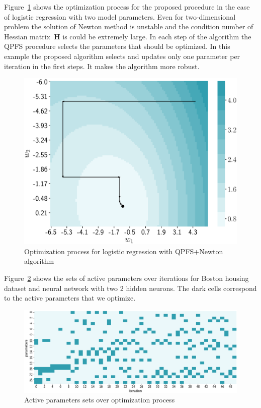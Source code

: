 \documentclass[a4paper,12pt]{article}
\theoremstyle{plain} %
\theoremstyle{definition} %
\theoremstyle{remark} %
\newcommand{\bH}{\mathbf{H}}
\begin{document}
	Figure~\ref{fig:irls_qpfs_2d} shows the optimization process for the proposed procedure in the case of logistic regression with two model parameters. 
	Even for two-dimensional problem the solution of Newton method is unstable and the condition number of Hessian matrix~$\bH$ is could be extremely large. 
	In each step of the algorithm the QPFS procedure selects the parameters that should be optimized. In this example the proposed algorithm selects and updates only one parameter per iteration in the first steps. It makes the algorithm more robust.
	
	\begin{figure}[!h]
		\centering
		\includegraphics[width=0.6\linewidth]{figs/irls_qpfs_2d.eps}	 
		\caption{Optimization process for logistic regression with QPFS+Newton algorithm}
		\label{fig:irls_qpfs_2d}
	\end{figure}

	Figure~\ref{fig:active_params_wrt_iters} shows the sets of active parameters over iterations for Boston housing dataset and neural network with two 2 hidden neurons. The dark cells correspond to the active parameters that we optimize.

	\begin{figure}[!h]
		\centering
		\includegraphics[width=\linewidth]{figs/active_params_wrt_iters.eps}	 
		\caption{Active parameters sets over optimization process}
		\label{fig:active_params_wrt_iters}
	\end{figure}
	
\end{document}

